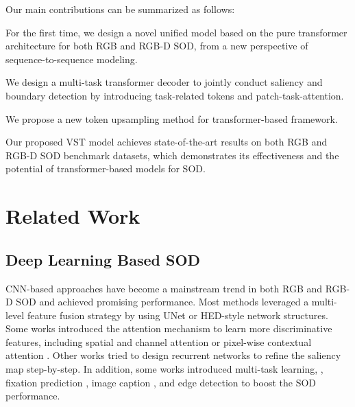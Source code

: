 \documentclass[10pt,twocolumn,letterpaper]{article}
\begin{document}
Our main contributions can be summarized as follows:
\begin{compactitem}
\item For the first time, we design a novel unified model based on the pure transformer architecture for both RGB and RGB-D SOD, from a new perspective of sequence-to-sequence modeling.

\item We design a multi-task transformer decoder to jointly conduct saliency and boundary detection by introducing task-related tokens and patch-task-attention.

\item We propose a new token upsampling method for transformer-based framework.

\item Our proposed VST model achieves state-of-the-art results on both RGB and RGB-D SOD benchmark datasets, which demonstrates its effectiveness and the potential of transformer-based models for SOD.

\end{compactitem}

\section{Related Work}

\subsection{Deep Learning Based SOD}
CNN-based approaches have become a mainstream trend in both RGB and RGB-D SOD and achieved promising performance.
Most methods \cite{hou2018dss,wang2017stagewise,MINet-CVPR2020,GateNet,fan2020bbsnet} leveraged a multi-level feature fusion strategy
by using UNet \cite{ronneberger2015unet} or HED-style \cite{xie2015hed} network structures.
Some works introduced the attention mechanism to learn more discriminative features, including spatial and channel attention \cite{Piao2019dmra,zhang2018pagr,fan2020bbsnet,chen2020dpanet} or pixel-wise contextual attention \cite{liu2018picanet}.
Other works \cite{liu2016dhsnet,wang2018rfcn,deng2018r3net,liu2019salient,chen2020PGAR} tried to design recurrent networks to refine the saliency map step-by-step.
In addition, some works introduced multi-task learning, \eg, fixation prediction \cite{wang2018salient}, image caption \cite{zhang2019capsal}, and edge detection \cite{qin2019basnet, zhao2019EGNet,CVPR2020_LDF,zhang2020select,Wei2020CoNet} to boost the SOD performance.
\end{document}
